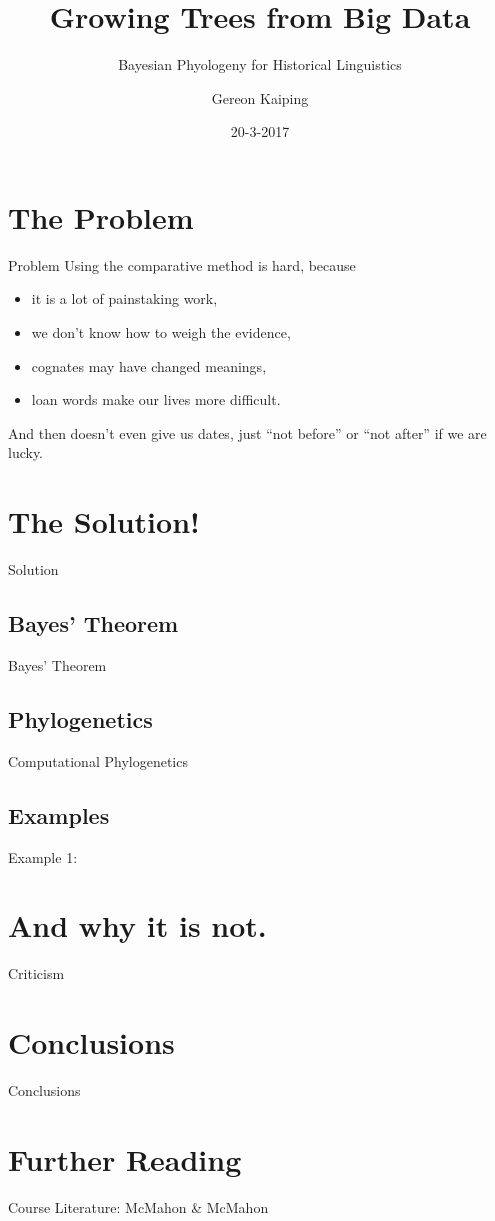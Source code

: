 \documentclass[9pt]{beamer}
\title{Growing Trees from Big Data}
\subtitle{Bayesian Phyologeny for Historical Linguistics}
\author{Gereon Kaiping}
\date{20-3-2017}
\begin{document}
\begin{frame}[plain]
  \titlepage
\end{frame}
\begin{frame}
  \tableofcontents
\end{frame}
\section{The Problem}
\begin{frame}{Problem}
  Using the comparative method is hard, because
  \begin{itemize}
  \item it is a lot of painstaking work,
  \item we don't know how to weigh the evidence,
  \item cognates may have changed meanings,
  \item loan words make our lives more difficult.
  \end{itemize}
  And then doesn't even give us dates, just “not before” or “not after” if we are lucky.
\end{frame}
\section{The Solution!}
\begin{frame}{Solution}
\end{frame}
\subsection{Bayes' Theorem}
\begin{frame}{Bayes' Theorem}
\end{frame}
\subsection{Phylogenetics}
\begin{frame}{Computational Phylogenetics}
\end{frame}
\subsection{Examples}
\begin{frame}{Example 1:}
\end{frame}
\section{And why it is not.}
\begin{frame}{Criticism}
\end{frame}
\section{Conclusions}
\begin{frame}{Conclusions}
\end{frame}
\section{Further Reading}
\begin{frame}
  Course
  Literature: McMahon \& McMahon
\end{frame}
\end{document}
